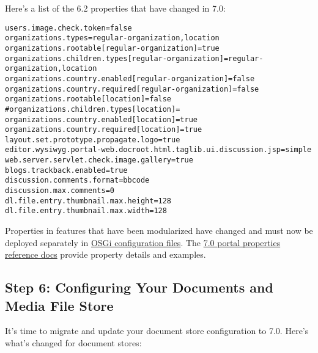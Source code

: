 Here's a list of the 6.2 properties that have changed in 7.0:

\begin{verbatim}
users.image.check.token=false
organizations.types=regular-organization,location
organizations.rootable[regular-organization]=true
organizations.children.types[regular-organization]=regular-organization,location
organizations.country.enabled[regular-organization]=false
organizations.country.required[regular-organization]=false
organizations.rootable[location]=false
#organizations.children.types[location]=
organizations.country.enabled[location]=true
organizations.country.required[location]=true
layout.set.prototype.propagate.logo=true
editor.wysiwyg.portal-web.docroot.html.taglib.ui.discussion.jsp=simple
web.server.servlet.check.image.gallery=true
blogs.trackback.enabled=true
discussion.comments.format=bbcode
discussion.max.comments=0
dl.file.entry.thumbnail.max.height=128
dl.file.entry.thumbnail.max.width=128
\end{verbatim}

Properties in features that have been modularized have changed and must
now be deployed separately in
\href{/docs/7-0/user/-/knowledge_base/u/system-settings\#exporting-and-importing-configurations}{OSGi
configuration files}. The
\href{@platform-ref@/7.0-latest/propertiesdoc/portal.properties.html}{7.0
portal properties reference docs} provide property details and examples.

\subsection{Step 6: Configuring Your Documents and Media File
Store}\label{step-6-configuring-your-documents-and-media-file-store}

It's time to migrate and update your document store configuration to
7.0. Here's what's changed for document stores:


